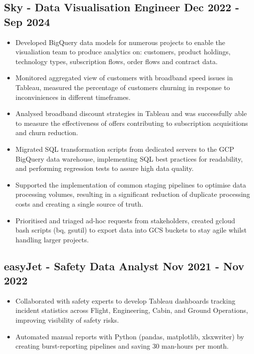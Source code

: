 \documentclass[a4paper, 10pt]{article}
\begin{document}
\subsection*{\textbf{Sky - Data Visualisation Engineer} \hfill  Dec 2022 - Sep 2024}
\begin{itemize}[noitemsep]
    \item Developed BigQuery data models for numerous projects to enable the visualiation team to produce analytics on: customers, product holdings, technology types, subscription flows, order flows and contract data.
    \item Monitored aggregated view of customers with broadband speed issues in Tableau, measured the percentage of customers churning in response to inconviniences in different timeframes.
    \item Analysed broadband discount strategies in Tableau and was successfully able to measure the effectiveness of offers contributing to subscription acquisitions and churn reduction.
    \item Migrated SQL transformation scripts from dedicated servers to the GCP BigQuery data warehouse, implementing SQL best practices for readability, and performing regression tests to assure high data quality.
    \item Supported the implementation of common staging pipelines to optimise data processing volumes, resulting in a significant reduction of duplicate processing costs and creating a single source of truth.
    \item Prioritised and triaged ad-hoc requests from stakeholders, created gcloud bash scripts (bq, gsutil) to export data into GCS buckets to stay agile whilst handling larger projects.
\end{itemize}

\subsection*{\textbf{easyJet - Safety Data Analyst} \hfill  Nov 2021 - Nov 2022}
\begin{itemize}[noitemsep]
    \item Collaborated with safety experts to develop Tableau dashboards tracking incident statistics across Flight, Engineering, Cabin, and Ground Operations, improving visibility of safety risks.
    \item Automated manual reports with Python (pandas, matplotlib, xlsxwriter) by creating burst-reporting pipelines and saving 30 man-hours per month. 
\end{itemize}
\end{document}
